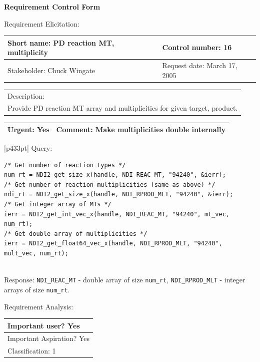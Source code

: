\begin{center}\Large\bf
Requirement Control Form
\end{center}
\vspace{24pt}

Requirement Elicitation:

\begin{tabular}{|p{211pt}|p{211pt}|} \hline
Short name: PD reaction MT, multiplicity & Control number: 16\\ \hline
Stakeholder: Chuck Wingate & Request date: March 17, 2005\\
\end{tabular}
\begin{tabular}{|p{433pt}|} \hline
Description: \\ 
Provide PD reaction MT array and multiplicities for given target, product. \\
\hline
\end{tabular} 
\begin{tabular}{|p{211pt}|p{211pt}|} \hline
Urgent: Yes & Comment: Make multiplicities double internally \\ \hline
\end{tabular}

\vspace{12pt}

\begin{tabular}{|p{433pt}|} \hline
Query:
\begin{verbatim}
/* Get number of reaction types */
num_rt = NDI2_get_size_x(handle, NDI_REAC_MT, "94240", &ierr);
/* Get number of reaction multiplicities (same as above) */
ndi_rt = NDI2_get_size_x(handle, NDI_RPROD_MLT, "94240", &ierr);
/* Get integer array of MTs */
ierr = NDI2_get_int_vec_x(handle, NDI_REAC_MT, "94240", mt_vec, num_rt);
/* Get double array of multiplicities */
ierr = NDI2_get_float64_vec_x(handle, NDI_RPROD_MLT, "94240", mult_vec, num_rt);
\end{verbatim}
\\ \hline
Response: \texttt{NDI\_REAC\_MT} - double array of size
\texttt{num\_rt}, \texttt{NDI\_RPROD\_MLT} - integer 
arrays of size \texttt{num\_rt}. \\ \hline
\end{tabular}
\vspace{24pt}

Requirement Analysis:

\begin{tabular}{|p{433pt}|} \hline
Important user? Yes \\ \hline
Important Aspiration? Yes \\ \hline
Classification: 1 \\ \hline
\end{tabular}
\vspace{24pt}

